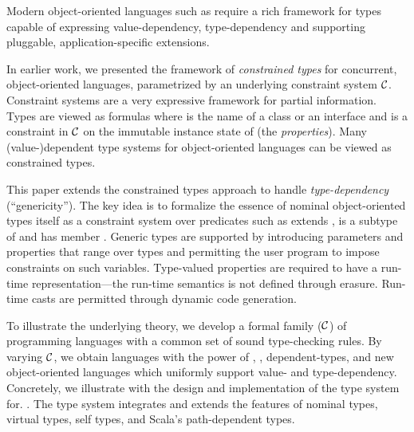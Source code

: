 Modern object-oriented languages such as \Xten{} require a rich
framework for types capable of expressing value-dependency,
type-dependency and supporting pluggable, application-specific
extensions.

In earlier work, we presented the framework of \emph{constrained types}
for concurrent, object-oriented languages, parametrized by an
underlying constraint system $\cal C$. Constraint systems are a very
expressive framework for partial information. Types are viewed as
formulas  where  is the name of a class or an interface
and
 is a constraint in $\cal C$ on the immutable instance state of
 (the \emph{properties}). Many (value-)dependent type systems
for object-oriented languages can be viewed as constrained types.

This paper extends the constrained types approach to handle
\emph{type-dependency} (``genericity''). The key idea is to formalize the
essence of nominal object-oriented types itself as a constraint system
over predicates such as  extends ,  is a subtype
of  and  has member . Generic types are supported
by introducing parameters and properties that range over types and
permitting the user program to impose constraints on such
variables. Type-valued properties are required to have a run-time
representation---the run-time semantics is not defined through
erasure. Run-time casts are permitted through dynamic code generation.

To illustrate the underlying theory, we develop a formal family
\FX(${\cal C}$) of programming languages with a common set of sound
type-checking rules.  By varying $\cal C$, we obtain languages with
the power of \FJ, \FGJ, dependent-types, and new object-oriented languages which
uniformly support value- and type-dependency.  Concretely, we
illustrate with the design and implementation of the type system for.
\Xten{}.  The type system integrates and extends the features of
nominal types, virtual types, self types, and Scala's path-dependent
types.
